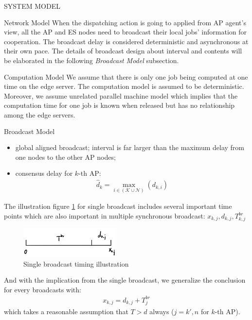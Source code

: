 \documentclass[10pt, conference, letterpaper]{IEEEtran}
\begin{document}
\begin{section}{SYSTEM MODEL}
\begin{subsection}{Network Model}
            When the dispatching action is going to applied from AP agent's view, all the AP and ES nodes need to broadcast their local jobs' information for cooperation. The broadcast delay is considered deterministic and asynchronous at their own pace.
            The details of broadcast design about interval and contents will be elaborated in the following \textit{Broadcast Model} subsection.
        \end{subsection}

        \begin{subsection}{Computation Model}
            We assume that there is only one job being computed at one time on the edge server. The computation model is assumed to be deterministic.
            Moreover, we assume unrelated parallel machine model which implies that the computation time for one job is known when released but has no relationship among the edge servers.
        \end{subsection}

        \begin{subsection}{Broadcast Model}
            \begin{itemize}
                \item global aligned broadcast; interval is far larger than the maximum delay from one nodes to the other AP nodes;
                \item consensus delay for $k$-th AP:
                    \begin{align}
                        \hat{d}_k = \max_{i\in(\mathcal{K} \cup \mathcal{N})}(d_{k,i})
                    \end{align}
            \end{itemize}

            The illustration figure \ref{fig:brd} for single broadcast includes several important time points which are also important in multiple synchronous broadcast: $x_{k,j}, d_{k,j}, T^{br}_{k,j}$
            \begin{figure}[ht]
                \centering
                \includegraphics[width=0.45\textwidth]{single-broadcast.png}
                \caption{Single broadcast timing illustration}
                \label{fig:brd}
            \end{figure}
            And with the implication from the single broadcast, we generalize the conclusion for every broadcasts with:
            \begin{align}
                x_{k,j} = d_{k,j} + T^{br}_{j}
            \end{align}
            which takes a reasonable assumption that $T>d$ always ($j=k',n$ for $k$-th AP).
        \end{subsection}
    \end{section}
\end{document}
